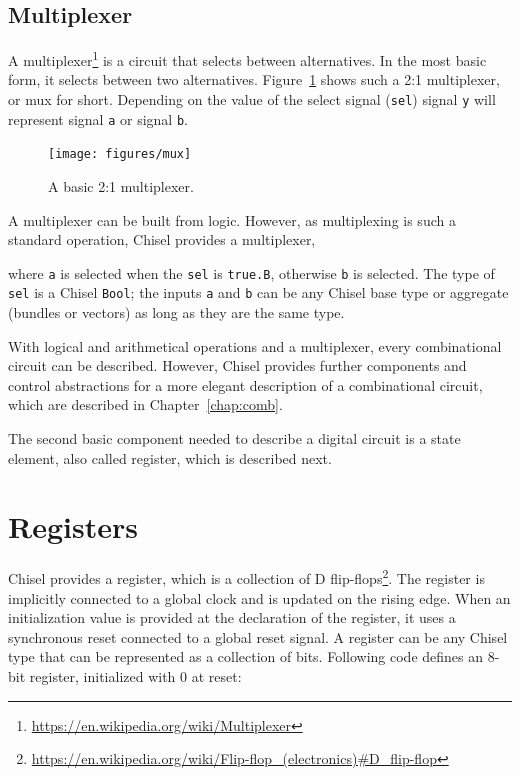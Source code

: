 \documentclass[%
    10pt,
    headinclude, footexclude,
    openright, %
    notitlepage,
    cleardoubleempty,
    headsepline,
    pointlessnumbers,
    bibtotoc, idxtotoc,
    ]{scrbook}
\newcommand{\code}[1]{{\small{\texttt{#1}}}}
\newcommand{\myref}[2]{\href{#1}{#2}}
\renewcommand{\myref}[2]{{#2}{\footnote{\url{#1}}}}
\begin{document}


\subsection{Multiplexer}


A \myref{https://en.wikipedia.org/wiki/Multiplexer}{multiplexer} is a circuit that selects between alternatives.
In the most basic form, it selects between two alternatives. Figure~\ref{fig:mux} shows
such a 2:1 multiplexer, or mux for short. Depending on the value of the
select signal (\code{sel}) signal \code{y} will represent signal \code{a} or
signal \code{b}.

\begin{figure}
  \centering
  \texttt{[image: figures/mux]}
  \caption{A basic 2:1 multiplexer.}
  \label{fig:mux}
\end{figure}

A multiplexer can be built from logic.
However, as multiplexing  is such a standard operation, Chisel provides a multiplexer,


\noindent where \code{a} is selected when the \code{sel} is \code{true.B}, otherwise \code{b}
is selected. The type of \code{sel} is a Chisel \code{Bool}; the inputs \code{a} and \code{b}
can be any Chisel base type or aggregate (bundles or vectors) as long as they are the same
type.

With logical and arithmetical operations and a multiplexer, every combinational
circuit can be described. However, Chisel provides further components and control abstractions
for a more elegant description of a combinational circuit, which are described in
Chapter~\ref{chap:comb}.

The second basic component needed to describe a digital circuit is a state element,
also called register, which is described next.

\section{Registers}


Chisel provides a register, which is a collection of
\myref{https://en.wikipedia.org/wiki/Flip-flop\_(electronics)\#D\_flip-flop}{D flip-flops}.
The register is implicitly connected to a global clock and is updated on the rising edge.
When an initialization value is provided at the declaration of the register,
it uses a synchronous reset connected to a global reset signal.
A register can be any Chisel type that can be represented as a collection of bits.
Following code defines an 8-bit register, initialized with 0 at reset:
\end{document}
